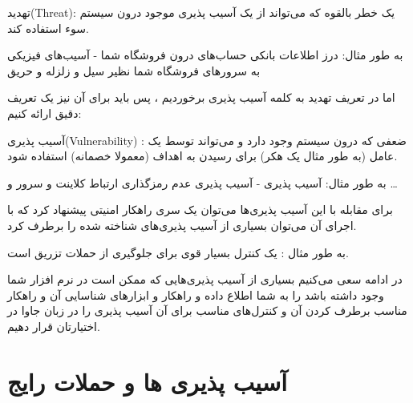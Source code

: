 \documentclass[]{article}
\begin{document}
تهدید(Threat): یک خطر بالقوه که می‌تواند از یک آسیب پذیری موجود درون سیستم سوء استفاده کند.

به طور مثال: درز اطلاعات بانکی حساب‌های درون فروشگاه شما  - آسیب‌های فیزیکی به سرور‌های فروشگاه شما نظیر سیل و زلزله و حریق 

اما در تعریف تهدید به کلمه آسیب پذیری برخوردیم ، پس باید برای آن نیز یک تعریف دقیق ارائه   کنیم:


\bigskip
آسیب پذیری(Vulnerability) : ضعفی که درون سیستم وجود دارد و می‌تواند توسط یک عامل (به طور مثال یک هکر) برای رسیدن به اهداف (معمولا خصمانه) استفاده شود.

به طور مثال: آسیب پذیری  \href{https://owasp.org/www-community/attacks/xss/}{\textcolor{blue}{\underline{}}}  - آسیب پذیری عدم رمزگذاری ارتباط کلاینت و سرور و …

برای مقابله با این آسیب پذیری‌ها می‌توان یک سری راهکار امنیتی پیشنهاد کرد که با اجرای آن می‌توان بسیاری از آسیب پذیری‌های شناخته شده را برطرف کرد.

به طور مثال :  یک کنترل بسیار قوی برای جلوگیری از حملات تزریق است. 

\bigskip

در ادامه سعی می‌کنیم بسیاری از آسیب پذیری‌هایی که ممکن است در نرم افزار شما وجود داشته باشد را به شما اطلاع داده و راهکار و ابزار‌های شناسایی آن و راهکار مناسب برطرف کردن آن و کنترل‌های مناسب برای آن آسیب پذیری را در زبان جاوا در اختیارتان قرار دهیم.

\newpage

\section*{{\titr آسیب پذیری ها و حملات رایج}}

\end{document}
